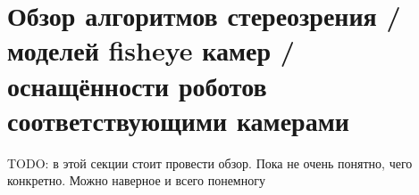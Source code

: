 \section{Обзор алгоритмов стереозрения / моделей fisheye камер / оснащённости роботов соответствующими камерами}

TODO: в этой секции стоит провести обзор. Пока не очень понятно, чего конкретно. Можно наверное и всего понемногу